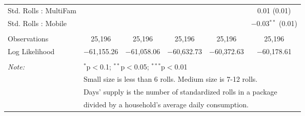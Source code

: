 \begin{table}[!htbp]
\begin{tabular}{@{\extracolsep{5pt}}lccccc}
  Std. Rolls : MultiFam &  &  &  &  & 0.01 (0.01) \\ 
  Std. Rolls : Mobile &  &  &  &  & $-$0.03$^{**}$ (0.01) \\ 
 \hline \\[-1.8ex] 
Observations & 25,196 & 25,196 & 25,196 & 25,196 & 25,196 \\ 
Log Likelihood & $-$61,155.26 & $-$61,058.06 & $-$60,632.73 & $-$60,372.63 & $-$60,178.61 \\ 
\hline 
\hline \\[-1.8ex] 
\textit{Note:}  & \multicolumn{5}{l}{$^{*}$p$<$0.1; $^{**}$p$<$0.05; $^{***}$p$<$0.01} \\ 
 & \multicolumn{5}{l}{Small size is less than 6 rolls. Medium size is 7-12 rolls. } \\ 
 & \multicolumn{5}{l}{Days' supply is the number of standardized rolls in a package} \\ 
 & \multicolumn{5}{l}{divided by a household's average daily consumption.} \\ 
\end{tabular} 
\end{table} 
